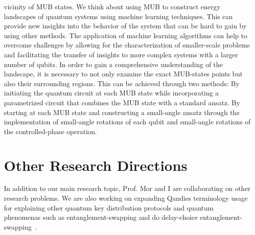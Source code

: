 \documentclass[12pt, a4paper]{article}
\begin{document}
    vicinity of MUB states.
    We think about using MUB to construct energy landscapes of quantum systems using machine learning techniques.
    This can provide new insights into the behavior of the system that can be hard to gain by using other methods.
    The application of machine learning algorithms can help to overcome challenges by allowing for the
    characterization of smaller-scale problems and facilitating the transfer of insights to more complex systems with a
    larger number of qubits.
    In order to gain a comprehensive understanding of the landscape, it is necessary to not only examine the exact
    MUB-states points but also their surrounding regions.
    This can be achieved through two methods:
    By initiating the quantum circuit at each MUB state while incorporating a parametrized circuit that combines the MUB state
    with a standard ansatz.
    By starting at each MUB state and constructing a small-angle ansatz through the implementation of small-angle
    rotations of each qubit and small-angle rotations of the controlled-phase operation.


    \section{Other Research Directions}\label{sec:other-research-directions}
    In addition to our main research topic, Prof. Mor and I are collaborating on other research problems.
    We are also working on expanding Qandies \cite{lin2021quantum} \cite{lin2020quantum} \cite{mor2022digital} terminology
    usage for explaining other quantum key distribution protocols and quantum phenomenas such as
    entanglement-swapping and do delay-choice entanglement-swapping~\cite{ma2016delayed}.

    
    
\end{document}
